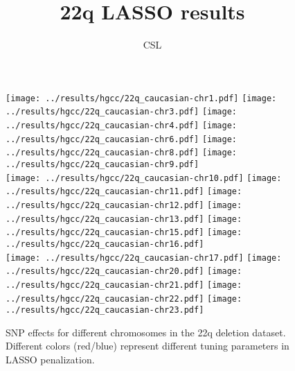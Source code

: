 \documentclass[11pt]{article}
\title{22q LASSO results}
\author{CSL}
\date{}
\theoremstyle{definition}
\begin{document}
\maketitle

\begin{figure}[ht]
\texttt{[image: ../results/hgcc/22q\_caucasian-chr1.pdf]}
\texttt{[image: ../results/hgcc/22q\_caucasian-chr3.pdf]}
\texttt{[image: ../results/hgcc/22q\_caucasian-chr4.pdf]}
\texttt{[image: ../results/hgcc/22q\_caucasian-chr6.pdf]}
\texttt{[image: ../results/hgcc/22q\_caucasian-chr8.pdf]}
\texttt{[image: ../results/hgcc/22q\_caucasian-chr9.pdf]}\\
\texttt{[image: ../results/hgcc/22q\_caucasian-chr10.pdf]}
\texttt{[image: ../results/hgcc/22q\_caucasian-chr11.pdf]}
\texttt{[image: ../results/hgcc/22q\_caucasian-chr12.pdf]}
\texttt{[image: ../results/hgcc/22q\_caucasian-chr13.pdf]}
\texttt{[image: ../results/hgcc/22q\_caucasian-chr15.pdf]}
\texttt{[image: ../results/hgcc/22q\_caucasian-chr16.pdf]}\\
\texttt{[image: ../results/hgcc/22q\_caucasian-chr17.pdf]}
\texttt{[image: ../results/hgcc/22q\_caucasian-chr20.pdf]}
\texttt{[image: ../results/hgcc/22q\_caucasian-chr21.pdf]}
\texttt{[image: ../results/hgcc/22q\_caucasian-chr22.pdf]}
\texttt{[image: ../results/hgcc/22q\_caucasian-chr23.pdf]}
\caption{SNP effects for different chromosomes in the 22q deletion
  dataset. Different colors (red/blue) represent different tuning
  parameters in LASSO penalization.}
\end{figure}
\end{document}
